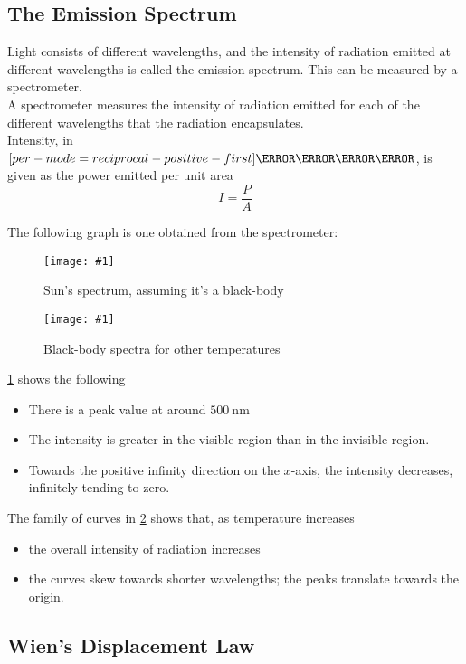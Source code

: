 \documentclass[a4paper,12pt]{article}
\let\oldsi\si
\renewcommand{\si}[1]{\oldsi[per-mode=reciprocal-positive-first]{#1}}
\newcommand{\lb}{\\[8pt]}
\newcommand{\img}[4]{\begin{center}
  \begin{figure}[H]
    \centering
    \texttt{[image: \#1]}
    \caption{#3}
    \label{fig:#4}
  \end{figure}
\end{center}}
\begin{document}
\subsection{The Emission Spectrum}

Light consists of different wavelengths, and the intensity of radiation emitted at different wavelengths is called the emission spectrum. This can be measured by a spectrometer.\lb
A spectrometer measures the intensity of radiation emitted for each of the different wavelengths that the radiation encapsulates.\lb
Intensity, in $\si{\W\per\m\squared}$, is given as the power emitted per unit area
$$I = \frac{P}{A}$$

The following graph is one obtained from the spectrometer:

\begin{minipage}{0.45\textwidth}
  \img{spectrumgraph.png}{1}{Sun's spectrum, assuming it's a black-body}{spectrum}
\end{minipage}%
\hspace{0.1\textwidth}
\begin{minipage}{0.5\textwidth}
  \img{spectragraphs.png}{1}{Black-body spectra for
    other temperatures}{spectra}
\end{minipage}

\cref{fig:spectrum} shows the following
\begin{itemize}
  \item There is a peak value at around $\SI{500}{\nano\m}$
  \item The intensity is greater in the visible region than in the invisible region.
  \item Towards the positive infinity direction on the $x$-axis, the intensity decreases, infinitely tending to zero.
\end{itemize}

The family of curves in \cref{fig:spectra} shows that, as temperature increases
\begin{itemize}
  \item the overall intensity of radiation increases
  \item the curves skew towards shorter wavelengths; the peaks translate towards the origin.
\end{itemize}

\pagebreak

\subsection{Wien's Displacement Law}
\end{document}
